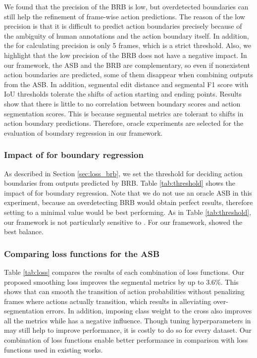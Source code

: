 \documentclass[10pt,twocolumn,letterpaper]{article}
\begin{document}
We found that the precision of the BRB is low, but overdetected boundaries can still help the refinement of frame-wise action predictions. 
The reason of the low precision is that it is difficult to predict action boundaries precisely because of the ambiguity of human annotations and the action boundary itself.
In addition, the  for calculating precision is only 5 frames, which is a strict threshold.
Also, we highlight that the low precision of the BRB does not have a negative impact.
In our framework, the ASB and the BRB are complementary, so even if nonexistent action boundaries are predicted, some of them disappear when combining outputs from the ASB.
In addition, segmental edit distance and segmental F1 score with IoU thresholds tolerate the shifts of action starting and ending points.
Results show that there is little to no correlation between boundary scores and action segmentation scores.
This is because segmental metrics are tolerant to shifts in action boundary predictions.
Therefore, oracle experiments are selected for the evaluation of boundary regression in our framework.

\vspace{-2pt}
\subsubsection{Impact of  for boundary regression}
As described in Section \ref{sec:loss_brb}, we set the threshold  for deciding action boundaries from outputs predicted by BRB.
Table \ref{tab:threshold} shows the impact of  for boundary regression.
Note that we do not use an oracle ASB in this experiment, because an overdetecting BRB would obtain perfect results, therefore setting  to a minimal value would be best performing.
As in Table \ref{tab:threshold}, our framework is not particularly sensitive to .
For our framework,  showed the best balance.



\vspace{-2pt}
\subsubsection{Comparing loss functions for the ASB}
\label{sec:combination_loss}
Table \ref{tab:loss} compares the results of each combination of loss functions.
Our proposed smoothing loss  improves the segmental metrics by up to 3.6\%.
This shows that  can smooth the transition of action probabilities without penalizing frames where actions actually transition, which results in alleviating over-segmentation errors.
In addition, imposing class weight to the cross also improves all the metrics
while  has a negative influence.
Though tuning hyperparameters in  may still help to improve performance,
it is costly to do so for every dataset.
Our combination of loss functions enable better performance in comparison with loss functions used in existing works. 
\end{document}
